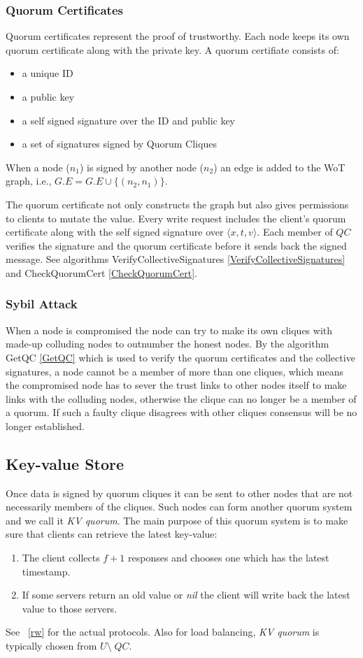 \subsubsection*{Quorum Certificates}
Quorum certificates represent the proof of trustworthy. Each node
keeps its own quorum certificate along with the private key. 
A quorum certifiate consists of:
\begin{itemize}
\item a unique ID
\item a public key
\item a self signed signature over the ID and public key
\item a set of signatures signed by Quorum Cliques
\end{itemize}
When a node ($n_1$) is signed by another node ($n_2$) an edge is added
to the WoT graph, i.e., $G.E = G.E \cup \{(n_2, n_1)\}$.

The quorum certificate not only constructs the graph but also gives
permissions to clients to mutate the value.
Every {\sf write} request includes the client's quorum certificate
along with the self signed signature over $\langle x, t, v
\rangle$. Each member of $QC$ verifies the signature and the quorum
certificate before it sends back the signed message. See algorithms
{\sf VerifyCollectiveSignatures} \ref{VerifyCollectiveSignatures} and
{\sf CheckQuorumCert} \ref{CheckQuorumCert}.

\subsubsection*{Sybil Attack}
When a node is compromised the node can try to make its own cliques
with made-up colluding nodes to outnumber the honest nodes. By the
algorithm {\sf GetQC} \ref{GetQC} which is used to verify the quorum
certificates and the collective signatures, a node cannot be a
member of more than one cliques, which means the compromised node has
to sever the trust links to other nodes itself to make links with the
colluding nodes, otherwise the clique can no longer be a member of a
quorum. If such a faulty clique disagrees with other cliques consensus
will be no longer established.

\subsection{Key-value Store}
Once data is signed by quorum cliques it can be sent to other nodes
that are not necessarily members of the cliques. Such nodes can form
another quorum system and we call it {\em KV quorum}. The main purpose
of this quorum system is to make sure that clients can retrieve the
latest key-value:
\begin{enumerate}
\item The client collects $f + 1$ responses and chooses one which
  has the latest timestamp.
\item If some servers return an old value or {\em
    nil} the client will write back the latest value to those servers.
\end{enumerate}
\ifdefined\ABSTRACT
\else
See ~\ref{rw} for the actual protocols.
\fi
Also for load balancing, {\em KV quorum} is typically chosen from $U
\setminus\; QC$.


